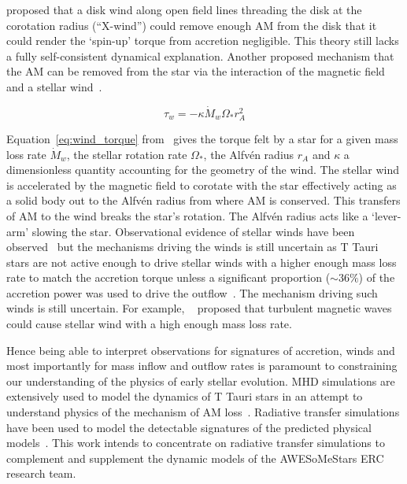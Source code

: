 \documentclass[fleqn,usenatbib]{mnras}
\begin{document}
\citep{Shu:tw} proposed that a disk wind along open field lines threading the disk at the corotation radius (``X-wind'') could remove enough AM from the disk that it could render the `spin-up' torque from accretion negligible. This theory still lacks a fully self-consistent dynamical explanation. Another proposed mechanism that the AM can be removed from the star via the interaction of the magnetic field and a stellar wind~\citep[e.g.][]{2005ApJ...632L.135M,Matt:2008bj}. 

\begin{equation}
    \tau_{w} = -\kappa \dot{M}_{w} \Omega_{\ast} r_A^2
    \label{eq:wind_torque}
\end{equation}

Equation~\ref{eq:wind_torque} from~\citep{2005ApJ...632L.135M} gives the torque felt by a star for a given mass loss rate $\dot{M}_{w}$, the stellar rotation rate $\Omega_{\ast}$, the Alfv\'en radius $r_A$ and $\kappa$ a dimensionless quantity accounting for the geometry of the wind. The stellar wind is accelerated by the magnetic field to corotate with the star effectively acting as a solid body out to the Alfv\'en radius from where AM is conserved. This transfers of AM to the wind breaks the star's rotation. The Alfv\'en radius acts like a `lever-arm' slowing the star. Observational evidence of stellar winds have been observed~\citep[e.g.][]{2003ApJ...599L..41E,2006ApJ...646..319E} but the mechanisms driving the winds is still uncertain as T Tauri stars are not active enough to drive stellar winds with a higher enough mass loss rate to match the accretion torque unless a significant proportion ($\sim 36\%$) of the accretion power was used to drive the outflow~\citep{2009A&A...508.1117Z,Matt:2008ic}. The mechanism driving such winds is still uncertain. For example, ~\citet{2008ApJ...689..316C} proposed that turbulent magnetic waves could cause stellar wind with a high enough mass loss rate.


Hence being able to interpret observations for signatures of accretion, winds and most importantly for mass inflow and outflow rates is paramount to constraining our understanding of the physics of early stellar evolution. MHD simulations are extensively used to model the dynamics of T Tauri stars in an attempt to understand physics of the mechanism of AM loss~\citep[e.g.][]{2009A&A...508.1117Z,Matt:2008bj,2019A&A...624A..31C,Romanova:2002hc}. Radiative transfer simulations have been used to model the detectable signatures of the predicted physical models~\citep[e.g.][]{Esau:2014is,2012MNRAS.426.2901K,Kurosawa:2011fh,1998AJ....116..455M,Hartmann:1994tl}. This work intends to concentrate on radiative transfer simulations to complement and supplement the dynamic models of the AWESoMeStars ERC research team.
\end{document}
